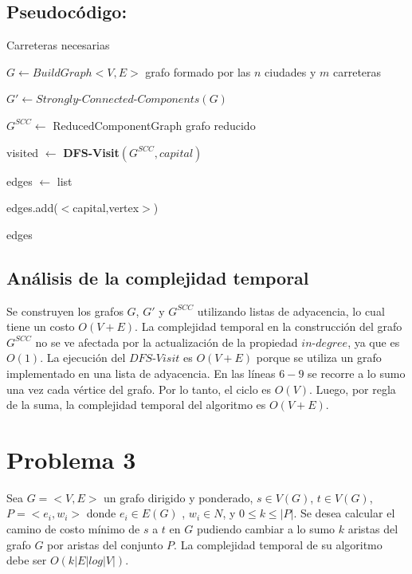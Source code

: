 \documentclass[a4paper,10pt]{article}
\begin{document}
	\subsection{Pseudoc\'odigo:}   
	
	\begin{algorithm}[h] 
		\caption{Carreteras necesarias}            
		\begin{algorithmic}[1]
			\label{MinimumRoads}
			\State $G \gets BuildGraph<V,E>$     \Comment grafo formado por las $n$ ciudades y $m$ carreteras
			
			\State $G' \gets Strongly$-$Connected$-$Components(G)$   
			
			\State $G^{SCC} \gets$ ReducedComponentGraph    \Comment grafo reducido
			
			\State visited $\gets$ \textbf{DFS-Visit}$(G^{SCC},capital)$
			
			\State edges $\gets$ list    
			
			\State edges.add($<$capital,vertex$>$)
			\EndIf
			\EndFor
			
			 edges       
		\end{algorithmic}
	\end{algorithm} 
	\subsection{Análisis de la complejidad temporal}
	Se construyen los grafos $G$, $G'$ y $G^{SCC}$ utilizando listas de adyacencia, lo cual tiene un costo $O(V+E)$. La complejidad temporal en la construcci\'on del grafo $G^{SCC}$ no se ve afectada por la actualizaci\'on de la propiedad $in$-$degree$, ya que es $O(1)$. La ejecuci\'on del $DFS$-$Visit$ es $O(V+E)$ porque se utiliza un grafo implementado en una lista de adyacencia. En las l\'ineas $6-9$ se recorre a lo sumo una vez cada v\'ertice del grafo. Por lo tanto, el ciclo es $O(V)$. Luego, por regla de la suma, la complejidad temporal del algoritmo es $O(V+E)$.
	\section{Problema 3}
	Sea $G = <V,E>$ un grafo dirigido y ponderado, $s \in V (G)$, $t \in V (G)$, $P = {<e_i,w_i>}$ donde $e_i \in E(G)$ , $w_i  \in N$, y $0 \leq k \leq |P|$. Se desea calcular el camino de costo mínimo de $s$ a $t$ en $G$ pudiendo cambiar a lo sumo $k$ aristas del grafo $G$ por aristas del conjunto $P$. La complejidad temporal de su algoritmo debe ser $O(k|E|log|V |)$.
	
\end{document}
